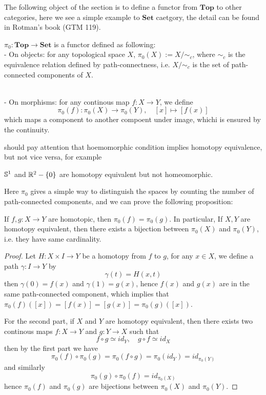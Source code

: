 \documentclass[12pt,a4paper]{article}
\begin{document}
The following object of the section is to define a functor from \(\mathbf{Top}\) to other categories, here we see a simple example to \(\mathbf{Set}\) caetgory, the detail can be found in Rotman's book (GTM 119).
\begin{definitionplain}
    \(\pi_0: \mathbf{Top} \to \mathbf{Set}\) is a functor defined as following:\\

    - On objects: for any topological space \(X\), \(\pi_0(X) := X/\sim_c\), where \(\sim_c\) is the equivalence relation defined by path-connectness, i.e. \(X/\sim_c\) is the set of path-connected components of \(X\).\\\

    - On morphisms: for any continous map \(f:X \to Y\), we define
    \[\pi_0(f): \pi_0(X) \to \pi_0(Y), \quad [x] \mapsto [f(x)]\]
    which maps a component to another compoent under image, whichi is ensured by the continuity.
\end{definitionplain}

should pay attention that hoemomorphic condition implies homotopy equivalence, but not vice versa, for example
\begin{center}
    \(\mathbb{S}^1\) and \(\mathbb{R}^2-\{0\}\) are homotopy equivalent but not homeomorphic.
\end{center} 
 Here \(\pi_0\) gives a simple way to distinguish the spaces by counting the number of path-connected components, and we can prove the following proposition:
\begin{proposition}
    If \(f,g:X \to Y\) are homotopic, then \(\pi_0(f) = \pi_0(g)\). In particular, If \(X,Y\) are homotopy equivalent, then there exists a bijection between \(\pi_0(X)\) and \(\pi_0(Y)\), i.e. they have same cardinality.
\end{proposition}

\begin{proof}
    Let \(H:X \times I \to Y\) be a homotopy from \(f\) to \(g\), for any \(x \in X\), we define a path \(\gamma: I \to Y\) by
    \[\gamma(t) = H(x,t)\]
    then \(\gamma(0) = f(x)\) and \(\gamma(1) = g(x)\), hence \(f(x)\) and \(g(x)\) are in the same path-connected component, which implies that \(\pi_0(f)([x]) = [f(x)] = [g(x)] = \pi_0(g)([x])\).

    For the second part, if \(X\) and \(Y\) are homotopy equivalent, then there exists two continous maps \(f:X \to Y\) and \(g:Y \to X\) such that
    \[f \circ g \simeq id_Y, \quad g \circ f \simeq id_X\]
    then by the first part we have
    \[\pi_0(f) \circ \pi_0(g) = \pi_0(f \circ g) = \pi_0(id_Y) = id_{\pi_0(Y)}\]
    and similarly
    \[\pi_0(g) \circ \pi_0(f) = id_{\pi_0(X)}\]
    hence \(\pi_0(f)\) and \(\pi_0(g)\) are bijections between \(\pi_0(X)\) and \(\pi_0(Y)\).
\end{proof}
\end{document}
